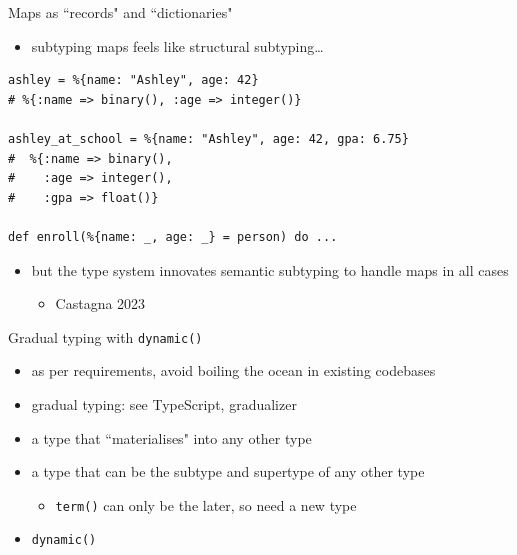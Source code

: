 \documentclass[
  ignorenonframetext,
  aspectratio=169]{beamer}
\newcommand{\passthrough}[1]{#1}
\providecommand{\tightlist}{%
  \setlength{\itemsep}{0pt}\setlength{\parskip}{0pt}}
\begin{document}
\begin{frame}[fragile]{Maps as ``records" and ``dictionaries"}
\label{maps-as-records-and-dictionaries-2}
\begin{itemize}
\tightlist
\item
  subtyping maps feels like structural subtyping\ldots{}
\end{itemize}

\begin{lstlisting}
ashley = %{name: "Ashley", age: 42}
# %{:name => binary(), :age => integer()}

ashley_at_school = %{name: "Ashley", age: 42, gpa: 6.75}
#  %{:name => binary(),
#    :age => integer(),
#    :gpa => float()}

def enroll(%{name: _, age: _} = person) do ...
\end{lstlisting}

\begin{itemize}
\tightlist
\item
  but the type system innovates semantic subtyping to handle maps in all
  cases

  \begin{itemize}
  \tightlist
  \item
    Castagna 2023
  \end{itemize}
\end{itemize}
\end{frame}

\begin{frame}[fragile]{Gradual typing with
\passthrough{\lstinline!dynamic()!}}
\label{gradual-typing-with-dynamic}
\begin{itemize}
\tightlist
\item
  as per requirements, avoid boiling the ocean in existing codebases
\item
  gradual typing: see TypeScript, gradualizer
\item
  a type that ``materialises" into any other type
\item
  a type that can be the subtype and supertype of any other type

  \begin{itemize}
  \tightlist
  \item
    \passthrough{\lstinline!term()!} can only be the later, so need a
    new type
  \end{itemize}
\item
  \passthrough{\lstinline!dynamic()!}
\end{itemize}
\end{frame}
\end{document}
